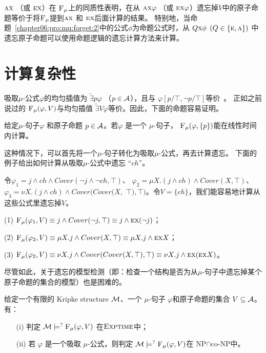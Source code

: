  $\textsc{a}\textsc{x}$ （或 $\textsc{e}\textsc{x}$）在 ${\textsc{F}_{\textsc{$\mu$}}}$上的同质性表明，在从 $\textsc{a}\textsc{x} \varphi$ （或 $\textsc{e}\textsc{x} \varphi$）遗忘掉$V$中的原子命题等价于将${\textsc{F}_{\textsc{$\mu$}}}$提到$\textsc{a}\textsc{x}$ 和 $\textsc{e} \textsc{x}$后面计算的结果。
特别地，当命题~\ref{chapter06:pro:mu:forget:2}中的公式$\phi$为命题公式时，从
$Q\textsc{x} \phi$ $(Q\in \{\textsc{e}, \textsc{a}\})$ 中遗忘原子命题可以使用命题逻辑的遗忘计算方法来计算。

\section{计算复杂性}
吸取$\mu$-公式$\varphi$的均匀插值为 $\widetilde{\exists}p \varphi$ （$p\in {\cal A}$），且与 $\varphi[p/\top,\neg p/\top]$等价~\cite{d2006modal}。
正如之前说过的 ${\textsc{F}_{\textsc{$\mu$}}}(\varphi, V)$与均匀插值 $\widetilde{\exists}V \varphi$等价\cite{d2006modal}。因此，下面的命题容易证明。
\begin{proposition}\label{pro:disLiT}
	给定$\mu$-句子$\varphi$ 和原子命题 $p\in {\cal A}$。若$\varphi$ 是一个 $\mu$-句子， ${\textsc{F}_{\textsc{$\mu$}}}(\varphi, \{p\})$能在线性时间内计算。
\end{proposition}

这种情况下，可以首先将一个$\mu$-句子转化为吸取$\mu$-公式，再去计算遗忘。
下面的例子给出如何计算从吸取$\mu$-公式中遗忘 “$ch$”。
\begin{example}
	令$\varphi_1=  j \wedge ch \wedge Cover(\neg j \wedge \neg ch, \top)$、 $ \varphi_2= \mu X. (j \wedge ch) \wedge Cover(X, \top)$、 $\varphi_3=  \nu X. (j \wedge ch) \wedge Cover(Cover(X,$ $\top), \top)$。令$V=\{ch\}$，我们能容易地计算从这些公式里遗忘掉$V$。
	
	(1) ${\textsc{F}_{\textsc{$\mu$}}}(\varphi_1, V) \equiv j \wedge Cover(\neg j, \top) \equiv j \wedge \textsc{e} \textsc{x}(\neg j)$；
	
	(2) ${\textsc{F}_{\textsc{$\mu$}}}(\varphi_2, V) \equiv \mu X. j  \wedge Cover(X, \top) \equiv \mu X. j \wedge \textsc{e} \textsc{x} X$；
	
	(3) ${\textsc{F}_{\textsc{$\mu$}}}(\varphi_2, V) \equiv \nu X. j \wedge Cover(Cover(X, \top), \top) \equiv \nu X. j \wedge \textsc{e} \textsc{x}(\textsc{e} \textsc{x} X)$。
\end{example}

尽管如此，关于遗忘的模型检测（即：检查一个结构是否为从$\mu$-句子中遗忘掉某个原子命题的集合的模型）也是困难的。
\begin{proposition}\label{chapter06:pro:MC}
	给定一个有限的 Kripke structure  ${\cal M}$、一个 $\mu$-句子 $\varphi$和原子命题的集合 $V\subseteq {\cal A}$。有：
	\begin{itemize}
		\item[(i)] 判定 ${\cal M} \models^? {\textsc{F}_{\textsc{$\mu$}}}(\varphi, V)$ 在$\textsc{Exptime}$中；
		\item[(ii)] 若 $\varphi$ 是一个吸取 $\mu$-公式，则判定 ${\cal M} \models^? {\textsc{F}_{\textsc{$\mu$}}}(\varphi, V)$在 \textsc{NP}$\cap$co-\textsc{NP}中。
	\end{itemize}
\end{proposition}


